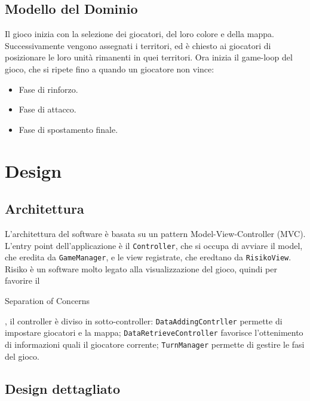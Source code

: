 \documentclass[a4paper,12pt]{report}
\begin{document}
\section{Modello del Dominio}

Il gioco inizia con la selezione dei giocatori, del loro colore e della mappa.
Successivamente vengono assegnati i territori, ed è chiesto ai giocatori di posizionare le loro unità rimanenti in quei territori.
Ora inizia il game-loop del gioco, che si ripete fino a quando un giocatore non vince:
\begin{itemize}
	\item Fase di rinforzo.
	\item Fase di attacco.
	\item Fase di spostamento finale.
\end{itemize}


\chapter{Design}

\section{Architettura}

L'architettura del software è basata su un pattern Model-View-Controller (MVC).
L'entry point dell'applicazione è il \texttt{Controller}, che si occupa di avviare il model, che eredita da \texttt{GameManager}, e le view registrate, che eredtano da \texttt{RisikoView}.
Risiko è un software molto legato alla visualizzazione del gioco, quindi per favorire il \begin{itshape}Separation of Concerns\end{itshape}, il controller è diviso in sotto-controller: \texttt{DataAddingContrller} permette di impostare giocatori e la mappa; \texttt{DataRetrieveController} favorisce l'ottenimento di informazioni quali il giocatore corrente; \texttt{TurnManager} permette di gestire le fasi del gioco.


\section{Design dettagliato}
\end{document}
